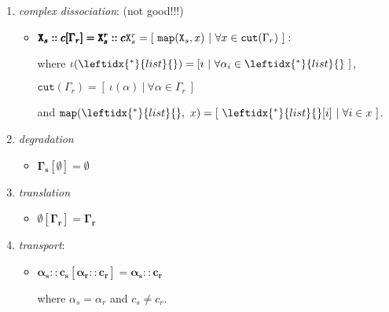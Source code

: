 \documentclass{entcs}
\renewcommand{\~}[0]{\texttildelow}
\begin{document}
\begin{definition}
\begin{enumerate}
\begin{itemize}
\end{itemize}

\item \textit{complex dissociation}: (not good!!!)

\begin{itemize}
\item $ \pmb{\mathtt{X}_s::c[\Gamma_r] = \mathtt{X}^r_s::c} \newline \mathtt{X}^r_s = [~\mathtt{map}(\mathtt{X}_s, x)~|~\forall x \in \mathtt{cut}(\Gamma_r)~]:$

where $\iota(\leftidx{^*}{list}{}) = [i~|~\forall \alpha_i \in \leftidx{^*}{list}{}~]$,

$\mathtt{cut}(\Gamma_r) = [~\iota(\alpha)~|~\forall \alpha \in \Gamma_r~]$

and $\mathtt{map}(\leftidx{^*}{list}{},~x) = [~\leftidx{^*}{list}{}[i]~|~\forall i \in x~] $.

\end{itemize}

\item \textit{degradation}
\begin{itemize}
\item $  \pmb{\Gamma_s[\emptyset] = \emptyset} $
\end{itemize}

\item \textit{translation}
\begin{itemize}
\item $ \pmb{\emptyset[\Gamma_r] = \Gamma_r} $
\end{itemize}

\item \textit{transport}:
\begin{itemize}
\item $ \pmb{\alpha_s::c_s[\alpha_r::c_r] = \alpha_s::c_r} $

where $\alpha_s = \alpha_r$ and $ c_s \neq c_r $.
\end{itemize}

\end{enumerate}
\end{definition}
\end{document}
